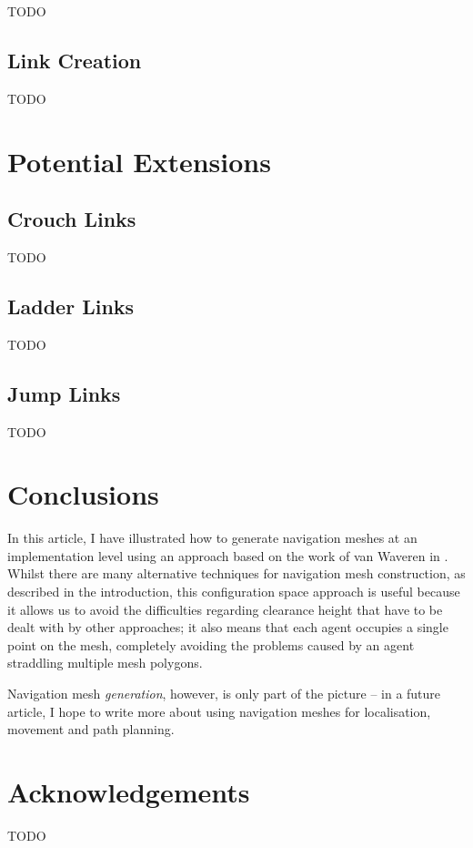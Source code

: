 \documentclass[10pt,twocolumn]{article}
\begin{document}
TODO

\subsection{Link Creation}

TODO

\section{Potential Extensions}

\subsection{Crouch Links}

TODO

\subsection{Ladder Links}

TODO

\subsection{Jump Links}

TODO

\section{Conclusions}

In this article, I have illustrated how to generate navigation meshes at an implementation level using an approach based on the work of van Waveren in \cite{vanwaveren01}. Whilst there are many alternative techniques for navigation mesh construction, as described in the introduction, this configuration space approach is useful because it allows us to avoid the difficulties regarding clearance height that have to be dealt with by other approaches; it also means that each agent occupies a single point on the mesh, completely avoiding the problems caused by an agent straddling multiple mesh polygons.

Navigation mesh \emph{generation}, however, is only part of the picture -- in a future article, I hope to write more about using navigation meshes for localisation, movement and path planning.

\section{Acknowledgements}

TODO




\end{document}
